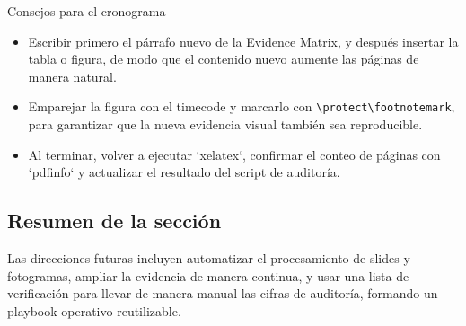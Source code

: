 \begin{knowledgebox}{Consejos para el cronograma}
\begin{itemize}
    \item Escribir primero el párrafo nuevo de la Evidence Matrix, y después insertar la tabla o figura, de modo que el contenido nuevo aumente las páginas de manera natural.
    \item Emparejar la figura con el timecode y marcarlo con \verb|\protect\footnotemark|, para garantizar que la nueva evidencia visual también sea reproducible.
    \item Al terminar, volver a ejecutar `xelatex`, confirmar el conteo de páginas con `pdfinfo` y actualizar el resultado del script de auditoría.
\end{itemize}
\end{knowledgebox}

\subsection{Resumen de la sección}
Las direcciones futuras incluyen automatizar el procesamiento de slides y fotogramas, ampliar la evidencia de manera continua, y usar una lista de verificación para llevar de manera manual las cifras de auditoría, formando un playbook operativo reutilizable.
